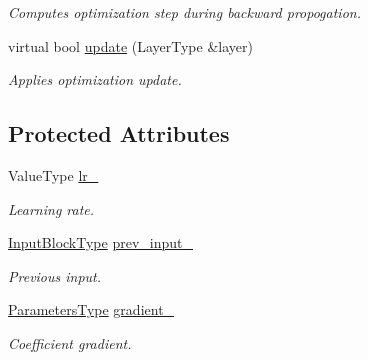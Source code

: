 \begin{DoxyCompactItemize}
\begin{DoxyCompactList}\small\item\em Computes optimization step during backward propogation. \end{DoxyCompactList}\item 
virtual bool \hyperlink{classffnn_1_1optimizer_1_1_gradient_descent_3_01layer_1_1_fully_connected_3_01_value_type_00_01_ddfb200b81fb62a6d9db0a043eb4e0ff_a9d80453a2e693e23943021af563a35e4}{update} (Layer\-Type \&layer)
\begin{DoxyCompactList}\small\item\em Applies optimization update. \end{DoxyCompactList}\end{DoxyCompactItemize}
\subsection*{Protected Attributes}
\begin{DoxyCompactItemize}
\item 
Value\-Type \hyperlink{classffnn_1_1optimizer_1_1_gradient_descent_3_01layer_1_1_fully_connected_3_01_value_type_00_01_ddfb200b81fb62a6d9db0a043eb4e0ff_a1bbfde5fbe4acf422bbba66c4a4ec354}{lr\-\_\-}
\begin{DoxyCompactList}\small\item\em Learning rate. \end{DoxyCompactList}\item 
\hyperlink{classffnn_1_1optimizer_1_1_gradient_descent_3_01layer_1_1_fully_connected_3_01_value_type_00_01_ddfb200b81fb62a6d9db0a043eb4e0ff_acef432d1b0d484bfeaf886db8c3cb016}{Input\-Block\-Type} \hyperlink{classffnn_1_1optimizer_1_1_gradient_descent_3_01layer_1_1_fully_connected_3_01_value_type_00_01_ddfb200b81fb62a6d9db0a043eb4e0ff_a460658037ced98085c44247a95c35441}{prev\-\_\-input\-\_\-}
\begin{DoxyCompactList}\small\item\em Previous input. \end{DoxyCompactList}\item 
\hyperlink{classffnn_1_1optimizer_1_1_gradient_descent_3_01layer_1_1_fully_connected_3_01_value_type_00_01_ddfb200b81fb62a6d9db0a043eb4e0ff_afab2e9175492cce91e264fbac5fa88ce}{Parameters\-Type} \hyperlink{classffnn_1_1optimizer_1_1_gradient_descent_3_01layer_1_1_fully_connected_3_01_value_type_00_01_ddfb200b81fb62a6d9db0a043eb4e0ff_a849361a121e5f2e53e6734770b516f1b}{gradient\-\_\-}
\begin{DoxyCompactList}\small\item\em Coefficient gradient. \end{DoxyCompactList}\end{DoxyCompactItemize}


